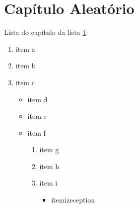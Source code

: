 \chapter{Capítulo Aleatório}
\label{chap:CapAle}

Lista do capítulo da lista \ref{chap:CapAle}:

\begin{enumerate}
\item item a
\item item b
\item item c
	\begin{itemize}
	\item item d
	\item item e
	\item item f
		\begin{enumerate}[label*=\arabic*.]
		\item item g
		\item item h
		\item item i
			\begin{itemize}
			\item itemizeception
			\end{itemize}
		\end{enumerate}
	\end{itemize}
\end{enumerate}